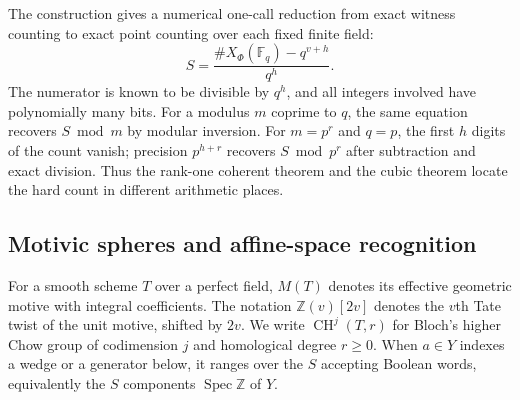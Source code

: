 The construction gives a numerical one-call reduction from exact witness counting to exact point counting over each fixed finite field:
\[
 S=\frac{\#X_\Phi(\mathbb F_q)-q^{v+h}}{q^h}.
\]
The numerator is known to be divisible by $q^h$, and all integers involved have polynomially many bits. For a modulus $m$ coprime to $q$, the same equation recovers $S\bmod m$ by modular inversion. For $m=p^r$ and $q=p$, the first $h$ digits of the count vanish; precision $p^{h+r}$ recovers $S\bmod p^r$ after subtraction and exact division. Thus the rank-one coherent theorem and the cubic theorem locate the hard count in different arithmetic places.

\subsection{Motivic spheres and affine-space recognition}
For a smooth scheme $T$ over a perfect field, $M(T)$ denotes its effective geometric motive with integral coefficients. The notation $\mathbb Z(v)[2v]$ denotes the $v$th Tate twist of the unit motive, shifted by $2v$. We write $\operatorname{CH}^j(T,r)$ for Bloch's higher Chow group of codimension $j$ and homological degree $r\geq0$. When $a\in Y$ indexes a wedge or a generator below, it ranges over the $S$ accepting Boolean words, equivalently the $S$ components $\operatorname{Spec}\mathbb Z$ of $Y$.

